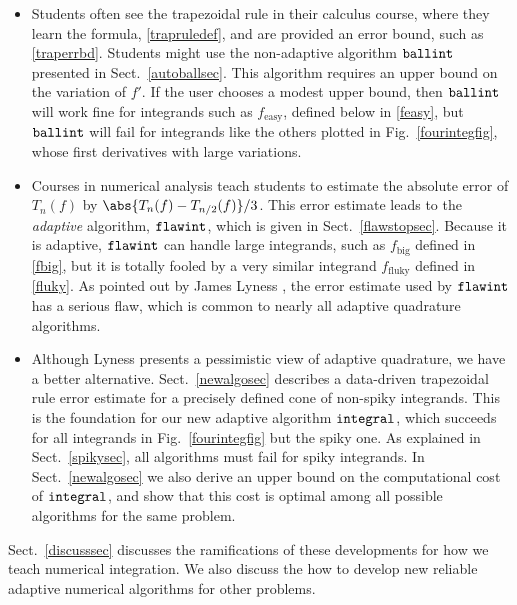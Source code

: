 \documentclass[]{article}
\DeclareMathOperator{\integ}{\texttt{\textup{integral}}}
\DeclareMathOperator{\flawinteg}{\texttt{\textup{flawint}}}
\DeclareMathOperator{\ballinteg}{\texttt{\textup{ballint}}}
\theoremstyle{definition}
\theoremstyle{remark}
\begin{document}
\begin{itemize}
\item Students often see the trapezoidal rule in their calculus course, where they learn the formula, \eqref{trapruledef}, and are provided an error bound, such as \eqref{traperrbd}.  Students might use the non-adaptive algorithm $\ballinteg$ presented in Sect.\ \ref{autoballsec}.  This algorithm requires an upper bound on the variation of $f'$.  If the user chooses a modest upper bound, then $\ballinteg$ will work fine for integrands such as $f_{\text{easy}}$, defined below in \eqref{feasy}, but $\ballinteg$ will fail for integrands like the others plotted in Fig.\ \ref{fourintegfig}, whose first derivatives with large variations.

\item Courses in numerical analysis teach students to estimate the absolute error of $T_n(f)$ by $\abs{T_n(f)-T_{n/2}(f)}/3$.  This error estimate leads to the \emph{adaptive} algorithm, $\flawinteg$, which is given in Sect.\ \ref{flawstopsec}. Because it is adaptive, $\flawinteg$ can handle large integrands, such as $f_{\text{big}}$ defined in \eqref{fbig}, but it is totally fooled by a very similar integrand  $f_{\text{fluky}}$ defined in \eqref{fluky}.  As pointed out by James Lyness , the error estimate used by $\flawinteg$ has a serious flaw, which is common to nearly all adaptive quadrature algorithms.

\item Although Lyness presents a pessimistic view of adaptive quadrature, we have a better alternative.  Sect.\ \ref{newalgosec} describes a data-driven trapezoidal rule error estimate for a precisely defined cone of non-spiky integrands. This is the foundation for our new adaptive algorithm $\integ$, which succeeds for all integrands in Fig.\ \ref{fourintegfig} but the spiky one.  As explained in Sect.\ \ref{spikysec}, all algorithms must fail for spiky integrands.  In Sect.\ \ref{newalgosec} we also derive an upper bound on the computational cost of $\integ$, and show that this cost is optimal among all possible algorithms for the same problem.  

\end{itemize}
Sect.\ \ref{discusssec}  discusses the ramifications of these developments for how we teach numerical integration.  We also discuss the how to develop new reliable adaptive numerical algorithms for other problems. 
\end{document}
